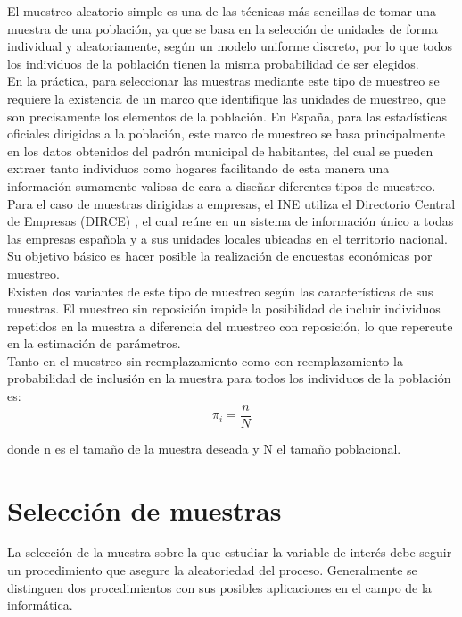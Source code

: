 
El muestreo aleatorio simple es una de las técnicas más sencillas de tomar una muestra de una población, ya que se basa en la selección de unidades de forma individual y aleatoriamente, según un modelo uniforme discreto, por lo que todos los individuos de la población tienen la misma probabilidad de ser elegidos.\\

En la práctica, para seleccionar las muestras mediante este tipo de muestreo se requiere la existencia de un marco que identifique las unidades de muestreo, que son precisamente los elementos de la población. En España, para las estadísticas oficiales dirigidas a la población, este marco de muestreo se basa principalmente en los datos obtenidos del padrón municipal de habitantes, del cual se pueden extraer tanto individuos como hogares facilitando de esta manera una información sumamente valiosa de cara a diseñar diferentes tipos de muestreo. Para el caso de muestras dirigidas a empresas, el INE utiliza el Directorio Central de Empresas (DIRCE) \cite{DIRCE}, el cual reúne en un sistema de información único a todas las empresas española y a sus unidades locales ubicadas en el territorio nacional. Su objetivo básico es hacer posible la realización de encuestas económicas por muestreo. \\

Existen dos variantes de este tipo de muestreo según las características de sus muestras. El muestreo sin reposición impide la posibilidad de incluir individuos repetidos en la muestra a diferencia del muestreo con reposición, lo que repercute en la estimación de parámetros.\\

Tanto en el muestreo sin reemplazamiento como con reemplazamiento la probabilidad de inclusión en la muestra para todos los individuos de la población es:\\
\begin{equation}\label{eq:1}
    \pi_i = \frac{n}{N}
\end{equation}

donde n es el tamaño de la muestra deseada y N el tamaño poblacional.

\section{Selección de muestras} \label{sect:3.1}
La selección de la muestra sobre la que estudiar la variable de interés debe seguir un procedimiento que asegure la aleatoriedad del proceso. Generalmente se distinguen dos procedimientos con sus posibles aplicaciones en el campo de la informática.\\

